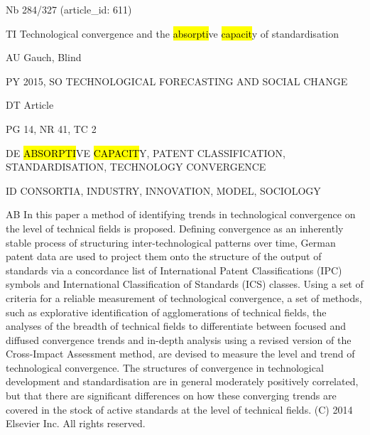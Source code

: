\documentclass[a4paper]{article}
\begin{document}
\vspace*{-2cm}
Nb \tabto{0cm}284/327 (article\_id: 611)\par
TI \tabto{0cm}Technological convergence and the \hl{absorpti}ve \hl{capacit}y of standardisation\par
AU \tabto{0cm}Gauch, Blind\par
PY \tabto{0cm}2015, SO TECHNOLOGICAL FORECASTING AND SOCIAL CHANGE\par
DT \tabto{0cm}Article\par
PG \tabto{0cm}14, NR 41, TC 2\par
DE \tabto{0cm}\hl{ABSORPTI}VE \hl{CAPACIT}Y, PATENT CLASSIFICATION, STANDARDISATION, TECHNOLOGY CONVERGENCE\par
ID \tabto{0cm}CONSORTIA, INDUSTRY, INNOVATION, MODEL, SOCIOLOGY\par
AB \tabto{0cm}In this paper a method of identifying trends in technological convergence on the level of technical fields is proposed. Defining convergence as an inherently stable process of structuring inter-technological patterns over time, German patent data are used to project them onto the structure of the output of standards via a concordance list of International Patent Classifications (IPC) symbols and International Classification of Standards (ICS) classes. Using a set of criteria for a reliable measurement of technological convergence, a set of methods, such as explorative identification of agglomerations of technical fields, the analyses of the breadth of technical fields to differentiate between focused and diffused convergence trends and in-depth analysis using a revised version of the Cross-Impact Assessment method, are devised to measure the level and trend of technological convergence. The structures of convergence in technological development and standardisation are in general moderately positively correlated, but that there are significant differences on how these converging trends are covered in the stock of active standards at the level of technical fields. (C) 2014 Elsevier Inc. All rights reserved.\par
\clearpage
\end{document}
